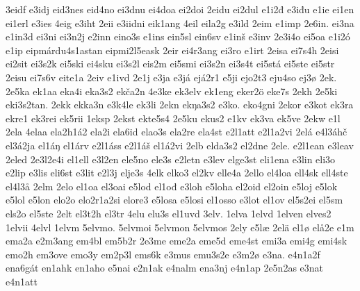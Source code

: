 {    3eidf
    e3idj
    eid3nes
    eid4no
    ei3dnu
    ei4doa
    ei2doi
    2eidu
    ei2dul
    e1i2đ
    e3iđu
    e1ie
    ei1en
    ei1erl
    e3ies
    4eig
    e3iht
    2eii
    e3iidni
    eik1ang
    4eil
    eila2g
    e3ild
    2eim
    e1imp
    2e6in.
    ei3na
    e1in3d
    ei3ni
    ei3n2j
    e2inn
    eino3s
    e1ins
    ein5sl
    ein6sv
    e1inš
    e3inv
    2e3i4o
    ei5oa
    e1i2ó
    e1ip
    eipmárdu4s1astan
    eipmi2l5eask
    2eir
    ei4r3ang
    ei3ro
    e1irt
    2eisa
    ei7s4h
    2eisi
    ei2sit
    ei3s2k
    ei5ski
    ei4sku
    ei3s2l
    eis2m
    ei5smi
    ei3s2n
    ei3s4t
    ei5stá
    ei5ste
    ei5str
    2eisu
    ei7s6v
    eite1a
    2eiv
    e1ivd
    2e1j
    e3ja
    e3já
    ejá2r1
    e5ji
    ejo2t3
    eju4so
    ej3ø
    2ek.
    2e5ka
    ek1aa
    eka4i
    eka3s2
    ekča2n
    4e3ke
    ek3elv
    ek1eng
    eker2ö
    eke7s
    2ekh
    2e5ki
    eki3s2tan.
    2ekk
    ekka3n
    e3k4le
    ek3li
    2ekn
    ekŋa3s2
    e3ko.
    eko4gni
    2ekor
    e3kot
    ek3ra
    ekre1
    ek3rei
    ek5rii
    1eksp
    2ekst
    ekte5s4
    2e5ku
    ekus2
    e1kv
    ek3va
    ek5ve
    2ekw
    e1l
    2ela
    4elaa
    ela2h1á2
    ela2i
    ela6id
    elao3s
    ela2re
    ela4st
    e2l1att
    e2l1a2vi
    2elá
    e4l3áhč
    el3á2ja
    el1áŋ
    el1árv
    e2l1áss
    e2l1áš
    el1á2vi
    2elb
    elda3s2
    el2dne
    2ele.
    e2l1ean
    e3leav
    2eled
    2e3l2e4i
    el1ell
    e3l2en
    ele5no
    ele3s
    e2letn
    e3lev
    elge3st
    eli1ena
    e3lin
    eli3o
    e2lip
    e3lis
    eli6st
    e3lit
    e2l3j
    elje3s
    4elk
    elko3
    el2kv
    elle4a
    2ello
    el4loa
    ell4sk
    ell4ste
    el4l3å
    2elm
    2elo
    el1oa
    el3oai
    e5lod
    el1ođ
    e3loh
    e5loha
    el2oid
    el2oin
    e5loj
    e5lok
    e5lol
    e5lon
    elo2o
    elo2r1a2si
    elore3
    e5losa
    e5losi
    el1osso
    e3lot
    el1ov
    el5s2ei
    el5sm
    els2o
    el5ste
    2elt
    el3t2h
    el3tr
    4elu
    elu3s
    el1uvd
    3elv.
    1elva
    1elvd
    1elven
    elves2
    1elvii
    4elvl
    1elvm
    5elvmo.
    5elvmoi
    5elvmon
    5elvmos
    2ely
    e5læ
    2elä
    el1ø
    elå2e
    e1m
    ema2a
    e2m3ang
    em4bl
    em5b2r
    2e3me
    eme2a
    eme5d
    eme4st
    emi3a
    emi4g
    emi4sk
    emo2h
    em3ove
    emo3y
    em2p3l
    ems6k
    e3mus
    emu3s2e
    e3m2ø
    e3na.
    e4n1a2f
    ena6gát
    en1ahk
    en1aho
    e5nai
    e2n1ak
    e4nalm
    ena3nj
    e4n1ap
    2e5n2as
    e3nat
    e4n1att
}

